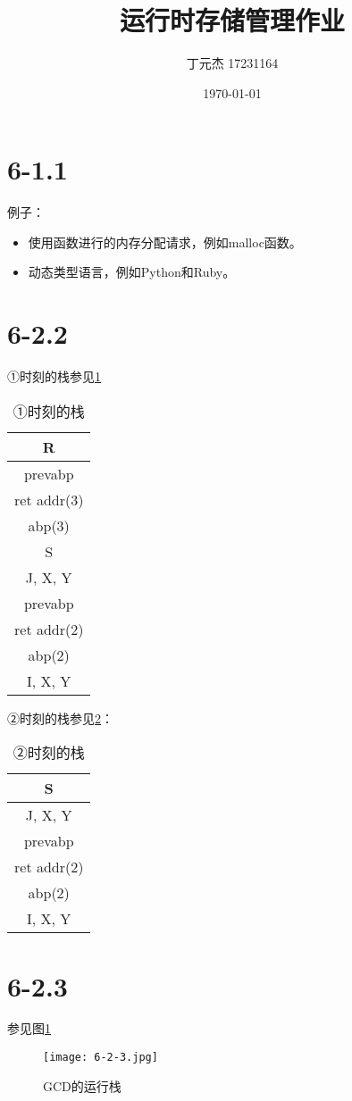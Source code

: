 \documentclass[UTF8]{ctexart}
\title{运行时存储管理作业}
\author{丁元杰 17231164}
\date{\today}
\begin{document}
\maketitle

\section*{6-1.1}
例子：
\begin{itemize}
    \item 使用函数进行的内存分配请求，例如malloc函数。
    \item 动态类型语言，例如Python和Ruby。
\end{itemize}

\section*{6-2.2}
①时刻的栈参见\ref{1}
\begin{table}[htbp!]
    \centering
    \begin{tabular}{|c|}
        \hline 
        R \\
        \hline
        prevabp \\
        \hline
        ret addr(3) \\
        \hline
        abp(3) \\
        \hline
        S \\
        \hline
        J, X, Y \\
        \hline
        prevabp \\
        \hline
        ret addr(2)\\
        \hline
        abp(2)\\
        \hline
        I, X, Y \\
        \hline
        
    \end{tabular}
    \caption{①时刻的栈}
    \label{1}
\end{table}

②时刻的栈参见\ref{2}：

\begin{table}[htbp!]
    \centering
    \begin{tabular}{|c|}
        \hline
        S \\
        \hline
        J, X, Y \\
        \hline
        prevabp \\
        \hline
        ret addr(2)\\
        \hline
        abp(2)\\
        \hline
        I, X, Y \\
        \hline
    \end{tabular}
    \caption{②时刻的栈}
    \label{2}
\end{table}

\section*{6-2.3}
参见图\ref{stack}
\begin{figure}[htbp!]
    \centering
    \texttt{[image: 6-2-3.jpg]}
    
    \caption{GCD的运行栈}
    \label{stack}
\end{figure}
\end{document}
